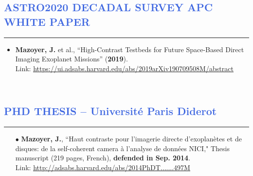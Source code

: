\documentclass[12pt]{article}
\begin{document}

\vspace{-1cm}
\textcolor{RoyalBlue}{\section{\large ASTRO2020 DECADAL SURVEY APC WHITE PAPER}
\vspace{-0.35cm}\hrule}
\vspace{0.5cm}
\begin{itemize}
\item \textbf{Mazoyer, J.} et al., “High-Contrast Testbeds for Future Space-Based Direct Imaging Exoplanet Missions” (\textbf{2019}).\\
Link: \textcolor{BrickRed}{\underline{\url{https://ui.adsabs.harvard.edu/abs/2019arXiv190709508M/abstract}}}
\end{itemize}

\newpage
\textcolor{White}{.}
\vspace{-1.8cm}
\textcolor{RoyalBlue}{\section{\large PHD THESIS -- Universit\'e Paris Diderot}
\vspace{-0.35cm}\hrule}
\vspace{0.5cm}

\begin{itemize}
\item[$\bullet$] \textbf{Mazoyer, J.}, “Haut contraste pour l'imagerie directe d'exoplanètes et de disques: de la self-coherent camera à l'analyse de données NICI," Thesis manuscript (219 pages, French), \textbf{defended in Sep. 2014}. \\
Link: \textcolor{BrickRed}{\underline{\url{http://adsabs.harvard.edu/abs/2014PhDT.......497M}}}
\end{itemize}
\end{document}
